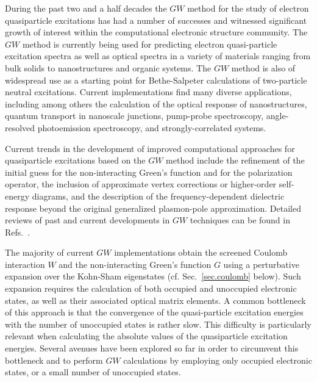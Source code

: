 \documentclass[twocolumn,prb,showpacs,superscriptaddress]{revtex4}
\begin{document}
During the past two and a half decades the $GW$ method\cite{hedin1,hl86}
for the study of electron quasiparticle excitations
has had a number of successes and witnessed significant growth of interest
within the computational electronic structure community.
The $GW$ method is currently being used for predicting electron quasi-particle
excitation spectra as well as optical spectra in a variety of materials
ranging from bulk solids to nanostructures and organic systems. The
$GW$ method is also of widespread use as a starting point for Bethe-Salpeter calculations
of two-particle neutral excitations.\cite{onida,bse1,bse2,bse3,rolfing,reining-review}
Current implementations find many diverse applications,
including among others the calculation of the optical response of nanostructures,\cite{catalin} quantum transport in nanoscale
junctions,\cite{rubio} pump-probe spectroscopy,\cite{catalin-lw} angle-resolved photoemission
spectroscopy,\cite{cheolhwan} and strongly-correlated systems.\cite{bruneval-oxide}

Current trends in the development of improved computational approaches for
quasiparticle excitations based on the $GW$ method include the refinement
of the initial guess for the non-interacting Green's function and for the
polarization operator,\cite{rinke,schilfegarde}
the inclusion of approximate vertex corrections or higher-order self-energy
diagrams,\cite{york} and the description of the frequency-dependent
dielectric response beyond the original generalized plasmon-pole approximation.\cite{spacetime,blochl}
Detailed reviews of past and current developments in $GW$ techniques can be
found in Refs.\ .

The majority of current $GW$ implementations obtain the screened Coulomb interaction
$W$ and the non-interacting Green's function $G$ using a perturbative
expansion over the Kohn-Sham eigenstates (cf. Sec.\ \ref{sec.coulomb} below). 
Such expansion requires the calculation of both occupied and unoccupied electronic states,
as well as their associated optical matrix elements.\cite{hl86} A common bottleneck 
of this approach is that the convergence of the quasi-particle excitation energies
with the number 
of unoccupied states is rather slow.\cite{sohrab} This difficulty is particularly relevant
when calculating the absolute values of the quasiparticle excitation energies.\cite{bruneval-gonze}
%
Several avenues have been explored so far in order to circumvent this bottleneck 
and to perform $GW$ calculations by employing only occupied electronic states,\cite{reining-sternheimer,umari1,umari2,gygi}
or a small number of unoccupied states.\cite{bruneval-gonze}
\end{document}
